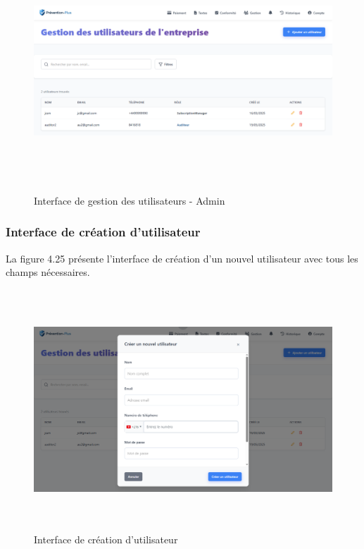 \begin{figure}[H]
    \centering
    \includegraphics[width=14cm,height=9cm]{images/adminmanageusers.PNG}
    \caption{Interface de gestion des utilisateurs - Admin}
\end{figure}

\subsubsection{Interface de création d'utilisateur}
\noindent La figure 4.25 présente l'interface de création d'un nouvel utilisateur avec tous les champs nécessaires.

\begin{figure}[H]
    \centering
    \includegraphics[width=14cm,height=9cm]{images/createusermodal.PNG}
    \caption{Interface de création d'utilisateur}
\end{figure}

